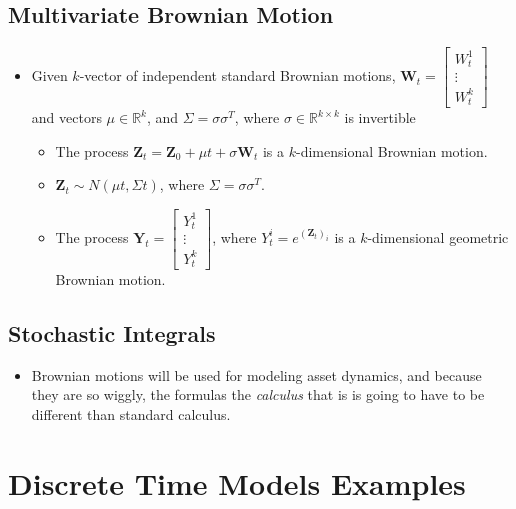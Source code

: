 \documentclass[11pt]{article}
\begin{document}
\subsection{Multivariate Brownian Motion}
\begin{itemize}
    \item Given $k$-vector of independent standard Brownian motions, $\boldsymbol{W}_t = 
    \begin{bmatrix} W_t^1 \\ \vdots \\ W_t^k \end{bmatrix}$ and vectors $\mu \in \mathbb{R}^k$,
    and $\Sigma = \sigma \sigma^T$, where $\sigma \in \mathbb{R}^{k \times k}$ is invertible
    \begin{itemize}
        \item The process $\boldsymbol{Z}_t = \boldsymbol{Z}_0 + \mu t + \sigma 
        \boldsymbol{W}_t$ is a $k$-dimensional Brownian motion. 
        \item $\boldsymbol{Z}_t \sim N (\mu t, \Sigma t)$, where $\Sigma = \sigma \sigma^T$.
        \item The process $\boldsymbol{Y}_t = \begin{bmatrix} Y_t^1 \\ \vdots \\ Y_t^k 
        \end{bmatrix}$, where $Y_t^i = e^{{(\boldsymbol{Z}_t)}_i}$ is a $k$-dimensional 
        geometric Brownian motion. 
    \end{itemize}
\end{itemize}

\subsection{Stochastic Integrals}
\begin{itemize}
    \item Brownian motions will be used for modeling asset dynamics, and because they are so 
    wiggly, the formulas \- the \textit{calculus} that is \- is going to have to be different 
    than standard calculus. 
\end{itemize}

\section{Discrete Time Models Examples}
\end{document}
